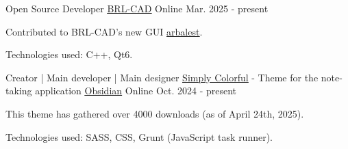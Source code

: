 



\begin{cventries}
  \cventry
    {Open Source Developer} %
    {\underline{\href{https://github.com/BRL-CAD/brlcad}{BRL-CAD}}} %
    {Online} %
    {Mar. 2025 - present} %
    {
      \begin{cvitems} %
        \item {Contributed to BRL-CAD's new GUI \underline{\href{https://github.com/BRL-CAD/arbalest}{arbalest}}.}
        \item {Technologies used: C++, Qt6.}
      \end{cvitems}
    }

\end{cventries}




\begin{cventries}
  \cventry
    {Creator | Main developer | Main designer} %
    {\underline{\href{https://github.com/LorenzoPegorari/SimplyColorful}{Simply Colorful}} - Theme for the note-taking application \underline{\href{https://obsidian.md}{Obsidian}}} %
    {Online} %
    {Oct. 2024 - present} %
    {
      \begin{cvitems} %
        \item {This theme has gathered over 4000 downloads (as of April 24th, 2025).}
        \item {Technologies used: SASS, CSS, Grunt (JavaScript task runner).}
      \end{cvitems}
    }

\end{cventries}
